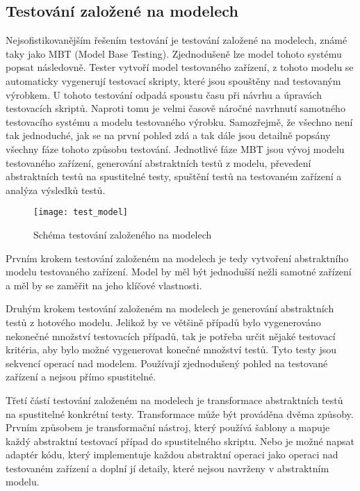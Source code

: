 \subsection{Testování založené na modelech}
Nejsofistikovanějším řešením testování je testování založené na modelech, známé taky jako MBT (Model Base Testing). Zjednodušeně lze model tohoto systému popsat následovně. Tester vytvoří model testovaného zařízení, z tohoto modelu se automaticky vygenerují testovací skripty, které jsou spouštěny nad testovaným výrobkem. U tohoto testování odpadá spoustu času při návrhu a úpravách testovacích skriptů. Naproti tomu je velmi časově náročné navrhnutí samotného testovacího systému a modelu testovaného výrobku. Samozřejmě, že všechno není tak jednoduché, jak se na první pohled zdá a tak dále jsou detailně popsány všechny fáze tohoto způsobu testování. Jednotlivé fáze MBT jsou vývoj modelu testovaného zařízení, generování abstraktních testů z modelu, převedení abstraktních testů na spustitelné testy, spuštění testů na testovaném zařízení a analýza výsledků testů.

\begin{figure}[h]
  \centering
  \texttt{[image: test\_model]}
  \caption{Schéma testování založeného na modelech}
  \label{fig:test_model}
\end{figure}

Prvním krokem testování založeném na modelech je tedy vytvoření abstraktního modelu testovaného zařízení. Model by měl být jednodušší nežli samotné zařízení a měl by se zaměřit na jeho klíčové vlastnosti.

Druhým krokem testování založeném na modelech je generování abstraktních testů z hotového modelu. Jelikož by ve většině případů bylo vygenerováno nekonečné množství testovacích případů, tak je potřeba určit nějaké testovací kritéria, aby bylo možné vygenerovat konečné množství testů. Tyto testy jsou sekvencí operací nad modelem. Používají zjednodušený pohled na testované zařízení a nejsou přímo spustitelné.

Třetí částí testování založeném na modelech je transformace abstraktních testů na spustitelné konkrétní testy. Transformace může být prováděna dvěma způsoby. Prvním způsobem je transformační nástroj, který používá šablony a mapuje každý abstraktní testovací případ do spustitelného skriptu. Nebo je možné napsat adaptér kódu, který implementuje každou abstraktní operaci jako operaci nad testovaném zařízení a doplní jí detaily, které nejsou navrženy v abstraktním modelu.

